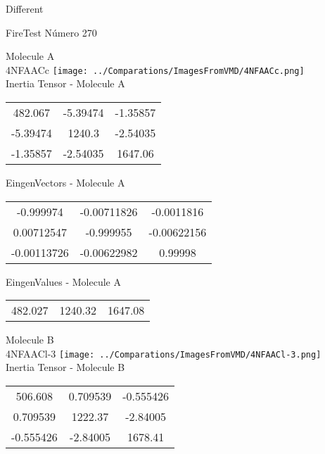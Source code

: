 \begin{center}
\vtab
\vtab
\textcolor{NavyBlue}{\Large Different}
\end{center}

 \newpage

\vtab[-2cm]
\begin{center}
{\large FireTest \tab Número 270}
\end{center}
\begin{multicols}{2}
\begin{center}

Molecule A \\ 
4NFAACc
\texttt{[image: ../Comparations/ImagesFromVMD/4NFAACc.png]}
\\
Inertia Tensor - Molecule A \\
\vtab

\begin{tabular}{|c c c|}
482.067	 & 	-5.39474	 & 	-1.35857	 \\
-5.39474	 & 	1240.3	 & 	-2.54035	 \\
-1.35857	 & 	-2.54035	 & 	1647.06
\end{tabular}

\vtab
 EingenVectors - Molecule A     \\
\vtab
\begin{tabular}{|c c c|}
-0.999974	 & 	-0.00711826	 & 	-0.0011816	 \\
0.00712547	 & 	-0.999955	 & 	-0.00622156	 \\
-0.00113726	 & 	-0.00622982	 & 	0.99998
\end{tabular}

\vtab
 EingenValues - Molecule A     \\
\vtab
\begin{tabular}{|c c c|}
482.027	 & 	1240.32	 & 	1647.08	 \\
\end{tabular}
\columnbreak

Molecule B \\ 
4NFAACl-3
\texttt{[image: ../Comparations/ImagesFromVMD/4NFAACl-3.png]}
\\
Inertia Tensor - Molecule B \\
\vtab

\begin{tabular}{|c c c|}
506.608	 & 	0.709539	 & 	-0.555426	 \\
0.709539	 & 	1222.37	 & 	-2.84005	 \\
-0.555426	 & 	-2.84005	 & 	1678.41
\end{tabular}


\end{center}
\end{multicols}
